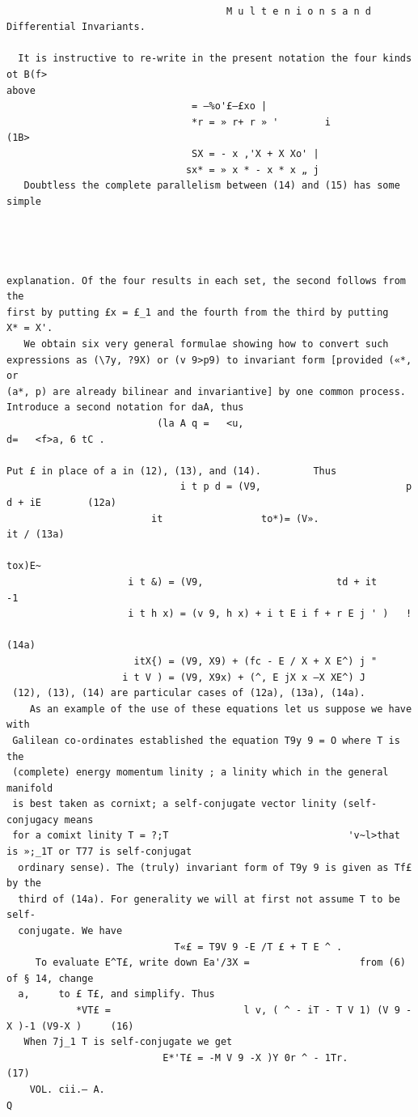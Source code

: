 \documentclass[10pt]{article}
\begin{document}
\clearpage
\begin{verbatim}

                                      M u l t e n i o n s a n d Differential Invariants.

  It is instructive to re-write in the present notation the four kinds ot B(f>
above
                                = —%o'£—£xo |
                                *r = » r+ r » '        i                             (1B>
                                SX = - x ,'X + X Xo' |
                               sx* = » x * - x * x „ j
   Doubtless the complete parallelism between (14) and (15) has some simple




explanation. Of the four results in each set, the second follows from the
first by putting £x = £_1 and the fourth from the third by putting
X* = X'.
   We obtain six very general formulae showing how to convert such
expressions as (\7y, ?9X) or (v 9>p9) to invariant form [provided («*,   or
(a*, p) are already bilinear and invariantive] by one common process.
Introduce a second notation for daA, thus
                          (la A q =   <u,                                                   d=   <f>a, 6 tC .

Put £ in place of a in (12), (13), and (14).         Thus
                              i t p d = (V9,                         p d + iE        (12a)
                         it                 to*)= (V».                          it / (13a)
                                                                            tox)E~
                     i t &) = (V9,                       td + it            -1
                     i t h x) = (v 9, h x) + i t E i f + r E j ' )   !
                                                                                     (14a)
                      itX{) = (V9, X9) + (fc - E / X + X E^) j "
                    i t V ) = (V9, X9x) + (^, E jX x —X XE^) J
 (12), (13), (14) are particular cases of (12a), (13a), (14a).
    As an example of the use of these equations let us suppose we have with
 Galilean co-ordinates established the equation T9y 9 = O where T is the
 (complete) energy momentum linity ; a linity which in the general manifold
 is best taken as cornixt; a self-conjugate vector linity (self-conjugacy means
 for a comixt linity T = ?;T                               'v~l>that is »;_1T or T77 is self-conjugat
  ordinary sense). The (truly) invariant form of T9y 9 is given as Tf£ by the
  third of (14a). For generality we will at first not assume T to be self-
  conjugate. We have
                             T«£ = T9V 9 -E /T £ + T E ^ .
     To evaluate E^T£, write down Ea'/3X =                   from (6) of § 14, change
  a,     to £ T£, and simplify. Thus
            *VT£ =                       l v, ( ^ - iT - T V 1) (V 9 -X )-1 (V9-X )     (16)
   When 7j_1 T is self-conjugate we get
                           E*'T£ = -M V 9 -X )Y 0r ^ - 1Tr.                       (17)
    VOL. cii.— A.                                                                Q


\end{verbatim}
\end{document}
